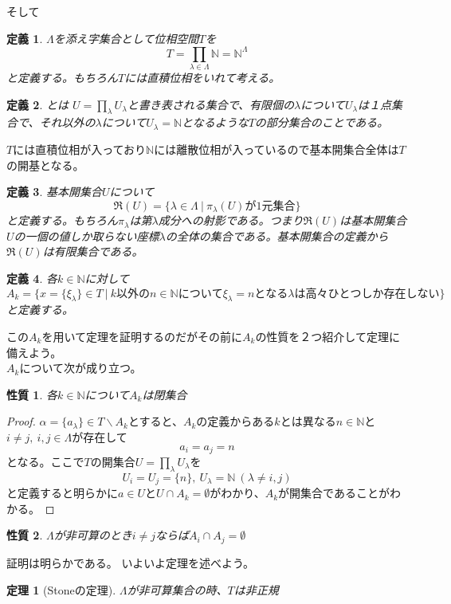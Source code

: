 \documentclass{jsarticle}
\newtheorem{theorem}{定理}
\newtheorem{df}{定義}
\newtheorem{claim}{性質}
\begin{document}
そして
\begin{df}$\Lambda$を添え字集合として位相空間$T$を
\[
T=\prod_{\lambda \in \Lambda} \mathbb{N}=\mathbb{N}^\Lambda
\]
と定義する。もちろん$T$には直積位相をいれて考える。
\end{df}
\begin{df}
とは
$U=\prod_{\lambda}U_{\lambda}$と書き表される集合で、有限個の$\lambda$について$U_{\lambda}$は１点集合で、それ以外の$\lambda$について$U_\lambda=\mathbb{N}$となるような$T$の部分集合のことである。
\end{df}
$T$には直積位相が入っており$\mathbb{N}$には離散位相が入っているので基本開集合全体は$T$の開基となる。\\ 
\begin{df}基本開集合$U$について
\[
\mathfrak{R}(U)=\{\lambda \in \Lambda\ |\ \pi_{\lambda}(U)が1元集合\}
\]
と定義する。もちろん$\pi_{\lambda}$は第$\lambda$成分への射影である。つまり$\mathfrak{R}(U)$は基本開集合$U$の一個の値しか取らない座標$\lambda$の全体の集合である。基本開集合の定義から$\mathfrak{R}(U)$は有限集合である。
\end{df}
\begin{df}各$k\in \mathbb{N}$に対して
\[
A_k=\{x=\{\xi_{\lambda}\} \in T\ |\ k以外のn\in \mathbb{N} について\xi_{\lambda}=nとなる\lambda は高々ひとつしか存在しない\}
\]
と定義する。
\end{df}この$A_k$を用いて定理を証明するのだがその前に$A_k$の性質を２つ紹介して定理に備えよう。\\ 
$A_k$について次が成り立つ。
\begin{claim}各$k\in \mathbb{N}$について$A_k$は閉集合
\end{claim}
\begin{proof}$\alpha=\{a_{\lambda}\}\in T\backslash A_k$とすると、$A_k$の定義からある$k$とは異なる$n\in \mathbb{N}$と$i\neq j,\ i,j\in \Lambda$が存在して
\[
a_i=a_j=n
\]となる。ここで$T$の開集合$U=\prod_{\lambda}U_{\lambda}$を
\[
U_i=U_j=\{n\},\ U_{\lambda}=\mathbb{N}\ (\lambda\neq i,j)
\]
と定義すると明らかに$a\in U$と$U\cap A_k=\emptyset$がわかり、$A_k$が開集合であることがわかる。
\end{proof}
\begin{claim}$\Lambda$が非可算のとき$i\neq j$ならば$A_i\cap A_j=\emptyset$
\end{claim}証明は明らかである。
いよいよ定理を述べよう。
\begin{theorem}[Stoneの定理]\label{stone}$\Lambda$が非可算集合の時、$T$は非正規
\end{theorem}
\end{document}
